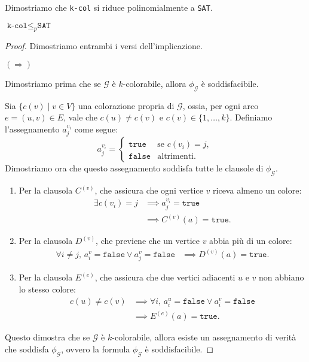 Dimostriamo che \texttt{k-col} si riduce polinomialmente a \texttt{SAT}.
\begin{theorem}
    $\texttt{k-col} \leq_p \texttt{SAT}$
\end{theorem}
\begin{proof} Dimostriamo entrambi i versi dell'implicazione.
    
    $(\Rightarrow)$

    
    Dimostriamo prima che se $\mathcal{G}$ è $k$-colorabile, allora $\phi_\mathcal{G}$ è
    soddisfacibile.

    Sia $\{c(v) \mid v \in V\}$ una colorazione propria di $\mathcal{G}$, ossia, per ogni
    arco $e=(u, v) \in E$, vale che $c(u) \neq c(v)$ e $c(v) \in \{1, \ldots, k\}$. Definiamo
    l'assegnamento $a_j^{v_i}$ come segue: 
    \[
    a_j^{v_i} =
    \begin{cases}
        \texttt{true} & \text{se } c(v_i) = j, \\
        \texttt{false} & \text{altrimenti}.
    \end{cases}
    \]
    Dimostriamo ora che questo assegnamento soddisfa tutte le clausole di $\phi_\mathcal{G}$.
    \begin{enumerate}
        \item Per la clausola $C^{(v)}$, che assicura che ogni vertice $v$ riceva almeno un colore:
        \begin{align*}
            \exists c(v_i) = j & \implies a_j^{v_i} = \texttt{true} \\
            & \implies C^{(v)}(a) = \texttt{true}.
        \end{align*}
        
        \item Per la clausola $D^{(v)}$, che previene che un vertice $v$ abbia più di un colore:
        \begin{align*}
            \forall i \neq j, \, a_i^{v} = \texttt{false} \lor a_j^{v} = \texttt{false} & \implies
            D^{(v)}(a) = \texttt{true}.
        \end{align*}
        
        \item Per la clausola $E^{(e)}$, che assicura che due vertici adiacenti $u$ e $v$ non
        abbiano lo stesso colore:
        \begin{align*}
            c(u) \neq c(v) & \implies \forall i, \, a_i^{u} = \texttt{false} \lor a_i^{v} =
            \texttt{false} \\
            & \implies E^{(e)}(a) = \texttt{true}.
        \end{align*}
    \end{enumerate}
    Questo dimostra che se $\mathcal{G}$ è $k$-colorabile, allora esiste un assegnamento
    di verità che soddisfa $\phi_\mathcal{G}$, ovvero la formula $\phi_\mathcal{G}$ è soddisfacibile.


\end{proof}
